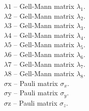 \documentclass[a4paper,11pt]{article}
\begin{document}
\textbf{$ \text{$\lambda $1} $ }-- Gell-Mann matrix $ \lambda _1. $\\

\textbf{$ \text{$\lambda $2} $ }-- Gell-Mann matrix $ \lambda _2. $\\

\textbf{$ \text{$\lambda $3} $ }-- Gell-Mann matrix $ \lambda _3. $\\

\textbf{$ \text{$\lambda $4} $ }-- Gell-Mann matrix $ \lambda _4. $\\

\textbf{$ \text{$\lambda $5} $ }-- Gell-Mann matrix $ \lambda _5. $\\

\textbf{$ \text{$\lambda $6} $ }-- Gell-Mann matrix $ \lambda _6. $\\

\textbf{$ \text{$\lambda $7} $ }-- Gell-Mann matrix $ \lambda _7. $\\

\textbf{$ \text{$\lambda $8} $ }-- Gell-Mann matrix $ \lambda _8. $\\

\textbf{$ \text{$\sigma $x} $ }-- Pauli matrix $ \sigma _x. $\\

\textbf{$ \text{$\sigma $y} $ }-- Pauli matrix $ \sigma _y. $\\

\textbf{$ \text{$\sigma $z} $ }-- Pauli matrix $ \sigma _z. $\\
\end{document}
